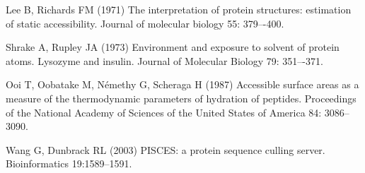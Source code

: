 \documentclass[a4paper,11pt]{article}
\begin{document}
\begin{thebibliography}{50}

  Lee B, Richards FM (1971) The interpretation of protein
  structures: estimation of static accessibility. Journal of molecular
  biology 55: 379–-400.

  Shrake A, Rupley JA (1973) Environment and exposure to
  solvent of protein atoms. Lysozyme and insulin. Journal of Molecular
  Biology 79: 351–-371.

  Ooi T, Oobatake M, Némethy G, Scheraga H (1987)
  Accessible surface areas as a measure of the thermodynamic
  parameters of hydration of peptides. Proceedings of the National
  Academy of Sciences of the United States of America 84: 3086–3090.

  Wang G, Dunbrack RL (2003) PISCES: a protein sequence culling server. 
  Bioinformatics 19:1589--1591.

\end{thebibliography}
\end{document}
